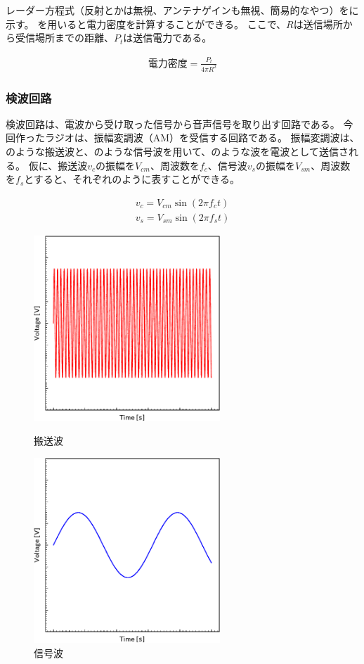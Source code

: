 \documentclass[report.tex]{subfiles}
\begin{document}
レーダー方程式（反射とかは無視、アンテナゲインも無視、簡易的なやつ）をに示す。
を用いると電力密度を計算することができる。
ここで、\(R\)は送信場所から受信場所までの距離、\(P_t\)は送信電力である。

\begin{align}
	電力密度 = \frac{P_t}{4 \pi R^2} \label{eq:radar}
\end{align}

\subsubsection{検波回路}

検波回路は、電波から受け取った信号から音声信号を取り出す回路である。
今回作ったラジオは、振幅変調波（AM）を受信する回路である。
振幅変調波は、のような搬送波と、のような信号波を用いて、のような波を電波として送信される。
仮に、搬送波\(v_c\)の振幅を\(V_{cm}\)、周波数を\(f_c\)、信号波\(v_s\)の振幅を\(V_{sm}\)、周波数を\(f_s\)とすると、それぞれのように表すことができる\cite{電子回路}。

\begin{align}
	v_c = V_{cm} \sin(2 \pi f_c t) \label{eq:v_c} \\
	v_s = V_{sm} \sin(2 \pi f_s t) \label{eq:v_s}
\end{align}

\begin{figure}[H]
	\begin{minipage}[b]{0.5\columnwidth}
		\centering
		\includegraphics[width=7cm]{fig/5V.pdf}
		\caption{搬送波}
		\label{fig:5V}
	\end{minipage}
	\begin{minipage}[b]{0.5\columnwidth}
		\centering
		\includegraphics[width=7cm]{fig/3V.pdf}
		\caption{信号波}
		\label{fig:3V}
	\end{minipage}
\end{figure}
\end{document}

